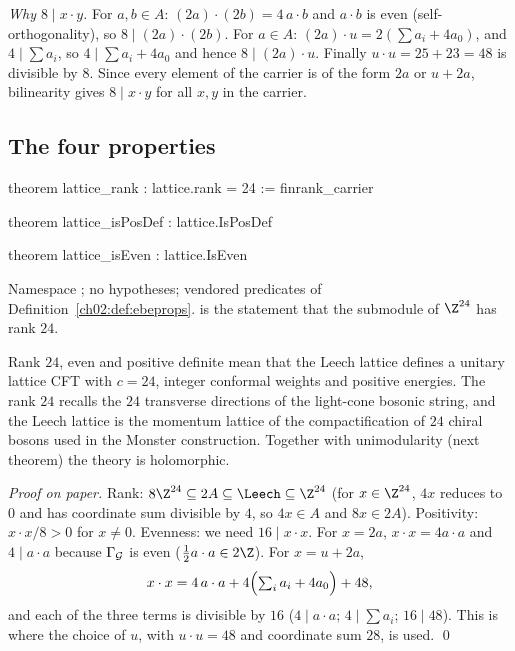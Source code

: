 \emph{Why $8\mid x\cdot y$.}  For $a,b\in A$: $(2a)\cdot(2b)=4\,a\cdot b$ and $a\cdot b$ is even
(self-orthogonality), so $8\mid(2a)\cdot(2b)$.  For $a\in A$: $(2a)\cdot u=2(\sum a_i+4a_0)$,
and $4\mid\sum a_i$, so $4\mid\sum a_i+4a_0$ and hence $8\mid(2a)\cdot u$.  Finally
$u\cdot u=25+23=48$ is divisible by $8$.  Since every element of the carrier is of the form $2a$
or $u+2a$, bilinearity gives $8\mid x\cdot y$ for all $x,y$ in the carrier.

\subsection{The four properties}

\begin{theorem}\label{ch02:thm:leechbasic}
\end{theorem}
\begin{leancode}
theorem lattice_rank : lattice.rank = 24 := finrank_carrier

theorem lattice_isPosDef : lattice.IsPosDef

theorem lattice_isEven : lattice.IsEven
\end{leancode}
\begin{dictionary}
Namespace ; no hypotheses; vendored predicates of
Definition~\ref{ch02:def:ebeprops}.   is the statement that the submodule
 of $\Z^{24}$ has rank $24$.
\end{dictionary}
\begin{physics}
Rank $24$, even and positive definite mean that the Leech lattice defines a unitary lattice CFT with $c=24$, integer conformal weights and positive energies. The rank $24$ recalls the $24$ transverse directions of the light-cone bosonic string, and the Leech lattice is the momentum lattice of the compactification of $24$ chiral bosons used in the Monster construction. Together with unimodularity (next theorem) the theory is holomorphic.
\end{physics}
\emph{Proof on paper.}  Rank: $8\Z^{24}\subseteq2A\subseteq\Leech\subseteq\Z^{24}$ (for $x\in\Z^{24}$,
$4x$ reduces to $0$ and has coordinate sum divisible by $4$, so $4x\in A$ and $8x\in2A$).
Positivity: $x\cdot x/8>0$ for $x\ne0$.  Evenness: we need $16\mid x\cdot x$.  For $x=2a$,
$x\cdot x=4a\cdot a$ and $4\mid a\cdot a$ because $\Gamma_{\mathcal{G}}$ is even
($\tfrac12a\cdot a\in2\Z$).  For $x=u+2a$,
\begin{equation*}
x\cdot x=4\,a\cdot a+4\Bigl(\textstyle\sum_ia_i+4a_0\Bigr)+48,
\end{equation*}
and each of the three terms is divisible by $16$ ($4\mid a\cdot a$; $4\mid\sum a_i$; $16\mid48$).
This is where the choice of $u$, with $u\cdot u=48$ and coordinate sum $28$, is used. \qed

